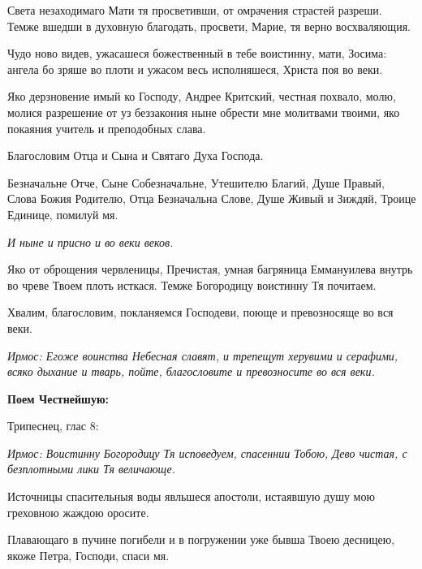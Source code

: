 

Света незаходимаго Мати тя просветивши, от омрачения страстей разреши. Темже вшедши в духовную благодать, просвети, Марие, тя верно восхваляющия.




Чудо ново видев, ужасашеся божественный в тебе воистинну, мати, Зосима: ангела бо зряше во плоти и ужасом весь исполняшеся, Христа поя во веки.




Яко дерзновение имый ко Господу, Андрее Критский, честная похвало, молю, молися разрешение от уз беззакония ныне обрести мне молитвами твоими, яко покаяния учитель и преподобных слава.


Благословим Отца и Сына и Святаго Духа Господа.

Безначальне Отче, Сыне Собезначальне, Утешителю Благий, Душе Правый, Слова Божия Родителю, Отца Безначальна Слове, Душе Живый и Зиждяй, Троице Единице, помилуй мя.


\itshape И ныне\normalfont{} и присно и во веки веков.


Яко от оброщения червленицы, Пречистая, умная багряница Еммануилева внутрь во чреве Твоем плоть исткася. Темже Богородицу воистинну Тя почитаем.


Хвалим, благословим, покланяемся Господеви, поюще и превозносяще во вся веки.


\itshape Ирмос\normalfont{}: Егоже воинства Небесная славят, и трепещут херувими и серафими, всяко дыхание и тварь, пойте, благословите и превозносите во вся веки. 

\medskip\bfseries Поем Честнейшую:


Трипеснец, глас 8:\normalfont{}




\itshape Ирмос\normalfont{}: Воистинну Богородицу Тя исповедуем, спасеннии Тобою, Дево чистая, с безплотными лики Тя величающе.




Источницы спасительныя воды явльшеся апостоли, истаявшую душу мою греховною жаждою оросите.




Плавающаго в пучине погибели и в погружении уже бывша Твоею десницею, якоже Петра, Господи, спаси мя.


